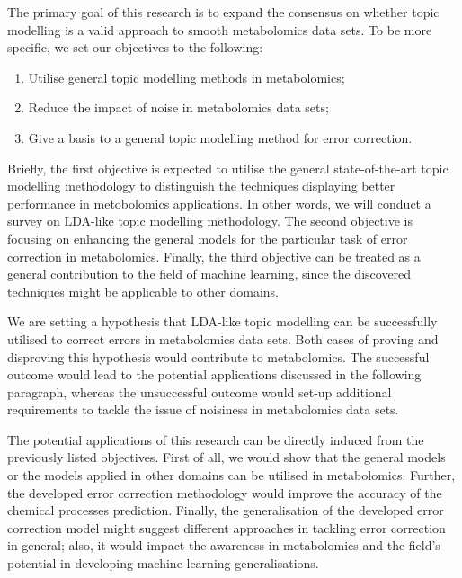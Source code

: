 \documentclass{mprop}
\begin{document}
\par The primary goal of this research is to expand the consensus on whether topic modelling is a valid approach to smooth metabolomics data sets. To be more specific, we set our objectives to the following:
\begin{enumerate}
    \item Utilise general topic modelling methods in metabolomics;
    \item Reduce the impact of noise in metabolomics data sets;
    \item Give a basis to a general topic modelling method for error correction.
\end{enumerate}
Briefly, the first objective is expected to utilise the general state-of-the-art topic modelling methodology to distinguish the techniques displaying better performance in metobolomics applications. In other words, we will conduct a survey on LDA-like topic modelling methodology. The second objective is focusing on enhancing the general models for the particular task of error correction in metabolomics. Finally, the third objective can be treated as a general contribution to the field of machine learning, since the discovered techniques might be applicable to other domains. 

\par We are setting a hypothesis that LDA-like topic modelling can be successfully utilised to correct errors in metabolomics data sets. Both cases of proving and disproving this hypothesis would contribute to metabolomics. The successful outcome would lead to the potential applications discussed in the following paragraph, whereas the unsuccessful outcome would set-up additional requirements to tackle the issue of noisiness in metabolomics data sets.

\par The potential applications of this research can be directly induced from the previously listed objectives. First of all, we would show that the general models or the models applied in other domains can be utilised in metabolomics. Further, the developed error correction methodology would improve the accuracy of the chemical processes prediction. Finally, the generalisation of the developed error correction model might suggest different approaches in tackling error correction in general; also, it would impact the awareness in metabolomics and the field's potential in developing machine learning generalisations.  
\end{document}
